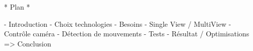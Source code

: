 * Plan *

- Introduction
- Choix technologies
- Besoins
- Single View / MultiView
- Contrôle caméra
- Détection de mouvements
- Tests
- Résultat / Optimisations
  => Conclusion
